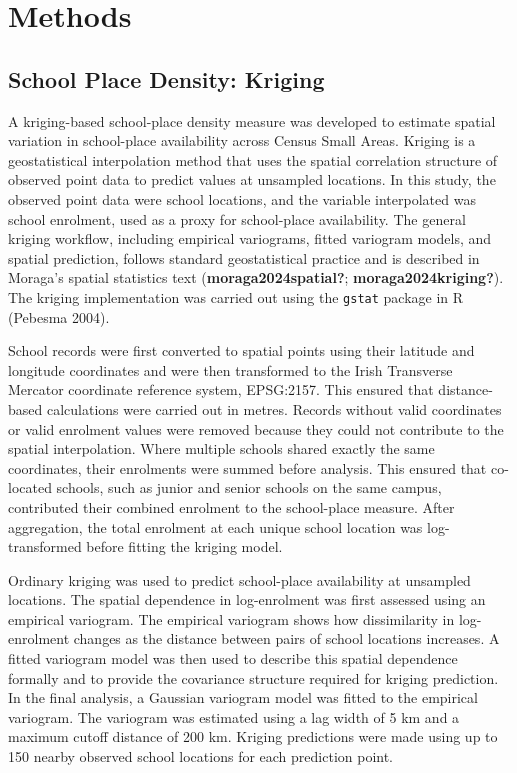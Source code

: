 \documentclass{article}
\begin{document}
\section{Methods}\label{methods}

\subsection{School Place Density:
Kriging}\label{school-place-density-kriging}

A kriging-based school-place density measure was developed to estimate
spatial variation in school-place availability across Census Small
Areas. Kriging is a geostatistical interpolation method that uses the
spatial correlation structure of observed point data to predict values
at unsampled locations. In this study, the observed point data were
school locations, and the variable interpolated was school enrolment,
used as a proxy for school-place availability. The general kriging
workflow, including empirical variograms, fitted variogram models, and
spatial prediction, follows standard geostatistical practice and is
described in Moraga's spatial statistics text
(\textbf{moraga2024spatial?}; \textbf{moraga2024kriging?}). The kriging
implementation was carried out using the \texttt{gstat} package in R
(Pebesma 2004).

School records were first converted to spatial points using their
latitude and longitude coordinates and were then transformed to the
Irish Transverse Mercator coordinate reference system, EPSG:2157. This
ensured that distance-based calculations were carried out in metres.
Records without valid coordinates or valid enrolment values were removed
because they could not contribute to the spatial interpolation. Where
multiple schools shared exactly the same coordinates, their enrolments
were summed before analysis. This ensured that co-located schools, such
as junior and senior schools on the same campus, contributed their
combined enrolment to the school-place measure. After aggregation, the
total enrolment at each unique school location was log-transformed
before fitting the kriging model.

Ordinary kriging was used to predict school-place availability at
unsampled locations. The spatial dependence in log-enrolment was first
assessed using an empirical variogram. The empirical variogram shows how
dissimilarity in log-enrolment changes as the distance between pairs of
school locations increases. A fitted variogram model was then used to
describe this spatial dependence formally and to provide the covariance
structure required for kriging prediction. In the final analysis, a
Gaussian variogram model was fitted to the empirical variogram. The
variogram was estimated using a lag width of 5 km and a maximum cutoff
distance of 200 km. Kriging predictions were made using up to 150 nearby
observed school locations for each prediction point.
\end{document}
